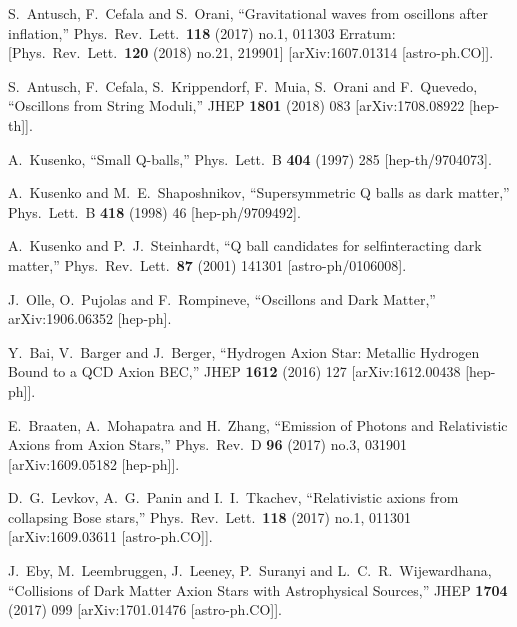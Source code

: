 \documentclass[11pt,a4paper]{article}
\begin{document}
\begin{thebibliography}{99}
  S.~Antusch, F.~Cefala and S.~Orani,
  ``Gravitational waves from oscillons after inflation,''
  Phys.\ Rev.\ Lett.\  {\bf 118} (2017) no.1,  011303
   Erratum: [Phys.\ Rev.\ Lett.\  {\bf 120} (2018) no.21,  219901]
  [arXiv:1607.01314 [astro-ph.CO]].
  
  S.~Antusch, F.~Cefala, S.~Krippendorf, F.~Muia, S.~Orani and F.~Quevedo,
  ``Oscillons from String Moduli,''
  JHEP {\bf 1801} (2018) 083
  [arXiv:1708.08922 [hep-th]].
  
  A.~Kusenko,
  ``Small Q-balls,''
  Phys.\ Lett.\ B {\bf 404} (1997) 285
  [hep-th/9704073].
  
  A.~Kusenko and M.~E.~Shaposhnikov,
  ``Supersymmetric Q balls as dark matter,''
  Phys.\ Lett.\ B {\bf 418} (1998) 46
  [hep-ph/9709492].
  
  A.~Kusenko and P.~J.~Steinhardt,
  ``Q ball candidates for selfinteracting dark matter,''
  Phys.\ Rev.\ Lett.\  {\bf 87} (2001) 141301
  [astro-ph/0106008].
  
  J.~Olle, O.~Pujolas and F.~Rompineve,
  ``Oscillons and Dark Matter,''
  arXiv:1906.06352 [hep-ph].

  Y.~Bai, V.~Barger and J.~Berger,
  ``Hydrogen Axion Star: Metallic Hydrogen Bound to a QCD Axion BEC,''
  JHEP {\bf 1612} (2016) 127
  [arXiv:1612.00438 [hep-ph]].
  
  E.~Braaten, A.~Mohapatra and H.~Zhang,
  ``Emission of Photons and Relativistic Axions from Axion Stars,''
  Phys.\ Rev.\ D {\bf 96} (2017) no.3,  031901
  [arXiv:1609.05182 [hep-ph]].
  
  D.~G.~Levkov, A.~G.~Panin and I.~I.~Tkachev,
  ``Relativistic axions from collapsing Bose stars,''
  Phys.\ Rev.\ Lett.\  {\bf 118} (2017) no.1,  011301
  [arXiv:1609.03611 [astro-ph.CO]].
  
  J.~Eby, M.~Leembruggen, J.~Leeney, P.~Suranyi and L.~C.~R.~Wijewardhana,
  ``Collisions of Dark Matter Axion Stars with Astrophysical Sources,''
  JHEP {\bf 1704} (2017) 099
  [arXiv:1701.01476 [astro-ph.CO]].
  

\end{thebibliography}
\end{document}
